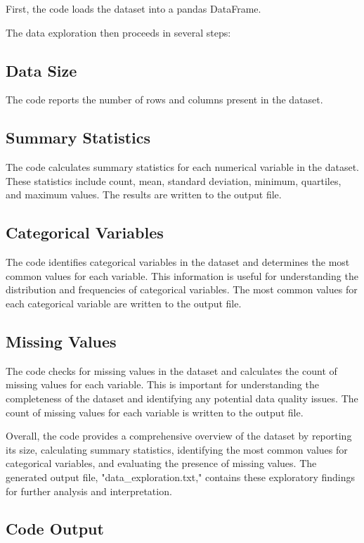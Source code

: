 \documentclass[11pt]{article}
\begin{document}
First, the code loads the dataset into a pandas DataFrame. 

The data exploration then proceeds in several steps:

\subsection{Data Size}
The code reports the number of rows and columns present in the dataset. 

\subsection{Summary Statistics}
The code calculates summary statistics for each numerical variable in the dataset. These statistics include count, mean, standard deviation, minimum, quartiles, and maximum values. The results are written to the output file.

\subsection{Categorical Variables}
The code identifies categorical variables in the dataset and determines the most common values for each variable. This information is useful for understanding the distribution and frequencies of categorical variables. The most common values for each categorical variable are written to the output file.

\subsection{Missing Values}
The code checks for missing values in the dataset and calculates the count of missing values for each variable. This is important for understanding the completeness of the dataset and identifying any potential data quality issues. The count of missing values for each variable is written to the output file.

Overall, the code provides a comprehensive overview of the dataset by reporting its size, calculating summary statistics, identifying the most common values for categorical variables, and evaluating the presence of missing values. The generated output file, "data\_exploration.txt," contains these exploratory findings for further analysis and interpretation.

\subsection{Code Output}
\end{document}
